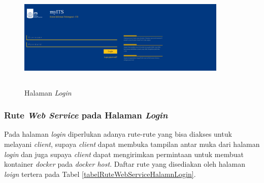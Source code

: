 \begin{figure}[H]
	\centering
	\includegraphics[width=10cm,height=5cm]{images/bab4/halamanlogin}
	\caption{Halaman \textit{Login}}
	\label{implementasihalamanlogin}
\end{figure}

\subsubsection{Rute \textit{Web Service} pada Halaman \textit{Login}}
Pada halaman \textit{login} diperlukan adanya rute-rute yang bisa diakses untuk melayani \textit{client}, supaya \textit{client} dapat membuka tampilan antar muka dari halaman \textit{login} dan juga supaya \textit{client} dapat mengirimkan permintaan untuk membuat kontainer \textit{docker} pada \textit{docker host}. Daftar rute yang disediakan oleh halaman \textit{loign} tertera pada Tabel \ref{tabelRuteWebServiceHalamnLogin}.\\
